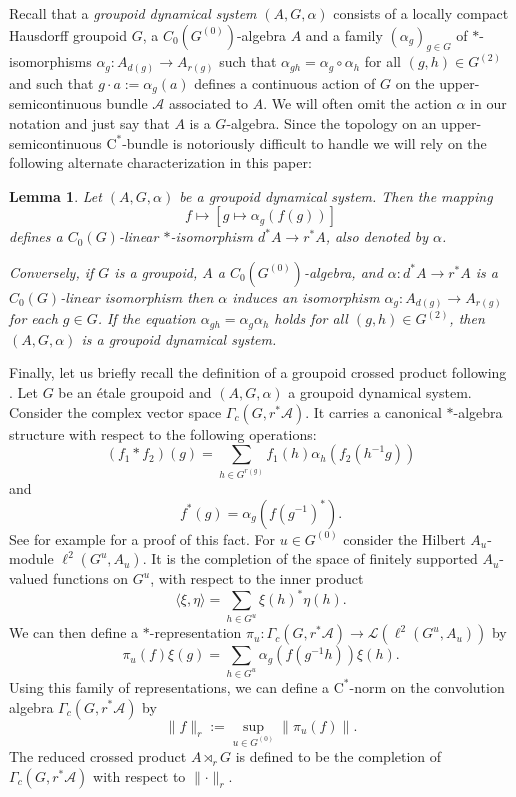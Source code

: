 \documentclass[reqno,oneside,a4paper,11pt]{amsart}
\theoremstyle{theorem}
\newtheorem{lemma}[satz]{Lemma}
\theoremstyle{definition}
\newcommand{\norm}[1]{\lVert#1\rVert}   %
\newcommand{\lk}{\langle}
\newcommand{\rk}{\rangle}
\begin{document}
	Recall that a \textit{groupoid dynamical system} $(A,G,\alpha)$ consists of a locally compact Hausdorff groupoid $G$, a $C_0(G^{(0)})$-algebra $A$ and a family $(\alpha_g)_{g\in G}$ of $*$-isomorphisms $\alpha_g:A_{d(g)}\rightarrow A_{r(g)}$ such that $\alpha_{gh}=\alpha_g\circ \alpha_h$ for all $(g,h)\in G^{(2)}$ and such that $g\cdot a:=\alpha_g(a)$ defines a continuous action of $G$ on the upper-semicontinuous bundle $\mathcal{A}$ associated to $A$.	
	We will often omit the action $\alpha$ in our notation and just say that $A$ is a $G$-algebra.
	Since the topology on an upper-semicontinuous $\mathrm{C}^*$-bundle is notoriously difficult to handle we will rely on the following alternate characterization in this paper:
	\begin{lemma}\cite[Lemma~4.3]{MR2547343}
		Let $(A,G,\alpha)$ be a groupoid dynamical system. Then the mapping $$f\mapsto [g\mapsto \alpha_g(f(g))]$$ defines a $C_0(G)$-linear $\ast$-isomorphism $d^*A\rightarrow r^*A$, also denoted by $\alpha$.
		
		Conversely, if $G$ is a groupoid, $A$ a $C_0(G^{(0)})$-algebra, and $\alpha:d^*A\rightarrow r^*A$ is a $C_0(G)$-linear isomorphism then $\alpha$ induces an isomorphism $\alpha_g:A_{d(g)}\rightarrow A_{r(g)}$ for each $g\in G$. If the equation $\alpha_{gh}=\alpha_g\alpha_h$ holds for all $(g,h)\in G^{(2)}$, then $(A,G,\alpha)$ is a groupoid dynamical system.
	\end{lemma}
	
	Finally, let us briefly recall the definition of a groupoid crossed product	following \cite{MR1900993}.
	Let $G$ be an étale groupoid and $(A,G,\alpha)$ a groupoid dynamical system. Consider the complex vector space $\Gamma_c(G,r^*\mathcal{A})$. It carries a canonical $*$-algebra structure with respect to the following operations:
	$$(f_1\ast f_2)(g)=\sum\limits_{h\in G^{r(g)}} f_1(h)\alpha_h(f_2(h^{-1}g))$$
	and
	$$f^*(g)=\alpha_g(f(g^{-1})^*).$$
	See for example \cite[Proposition~4.4]{MR2547343} for a proof of this fact.
	For $u\in G^{(0)}$ consider the Hilbert $A_u$-module $\ell^2(G^u,A_u)$. It is the completion of the space of finitely supported $A_u$-valued functions on $G^u$, with respect to the inner product 
	$$\lk \xi,\eta\rk=\sum\limits_{h\in G^u}\xi(h)^*\eta(h).$$
	We can then define a $*$-representation $\pi_u:\Gamma_c(G,r^*\mathcal{A})\rightarrow \mathcal{L}(\ell^2(G^u,A_u))$ by
	$$\pi_u(f)\xi(g)=\sum\limits_{h\in G^u}\alpha_g(f(g^{-1}h))\xi(h).$$
	Using this family of representations, we can define a $\mathrm{C}^*$-norm on the convolution algebra $\Gamma_c(G,r^*\mathcal{A})$ by
	$$\norm{f}_r:=\sup\limits_{u\in G^{(0)}}\norm{\pi_u(f)}.$$
	The reduced crossed product $A\rtimes_r G$ is defined to be the completion of $\Gamma_c(G,r^*\mathcal{A})$ with respect to $\norm{\cdot}_r$.
\end{document}
